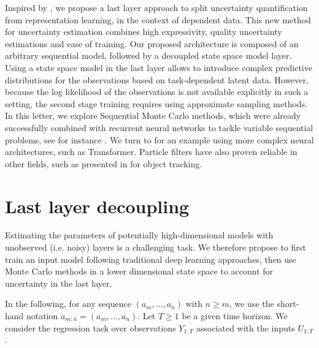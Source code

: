 \documentclass[journal]{IEEEtran}
\begin{document}
Inspired by \cite{Brosse2020OnLA}, we propose a last layer approach to split uncertainty quantification from representation learning, in the context of dependent data. This new method for uncertainty estimation combines high expressivity, quality uncertainty estimations and ease of training. Our proposed architecture is composed of an arbitrary sequential model, followed by a decoupled state space model layer. Using a state space model in the last layer allows to introduce complex predictive distributions for the observations based on task-dependent latent data. However, because the log likelihood of the observations is not available explicitly in such a setting, the second stage training requires using approximate sampling methods. In this letter, we explore Sequential Monte Carlo methods, which were already successfully combined with recurrent neural networks to tackle variable sequential problems, see for instance \cite{Ma2020}.
We turn to \cite{Martin2020TheMC} for an example using more complex neural architectures, such as Transformer.
Particle filters have also proven reliable in other fields, such as presented in \cite{Liu2020LSTMPF} for object tracking.




\section{Last layer decoupling}
Estimating the parameters of potentially high-dimensional models with unobserved (i.e. noisy) layers is a challenging task.
We therefore propose to first train an input model following traditional deep learning approaches, then use Monte Carlo methods in a lower dimensional state space to account for uncertainty in the last layer.

In the following, for any sequence $(a_m,\ldots, a_n)$ with $n\geq m$, we use the short-hand notation $a_{m:n} = (a_m,\ldots, a_n)$.
Let $T\ge 1$ be a given time horizon.
We consider the regression task over observations $Y_{1:T}$ associated with the inputs $U_{1:T}$.
\end{document}
